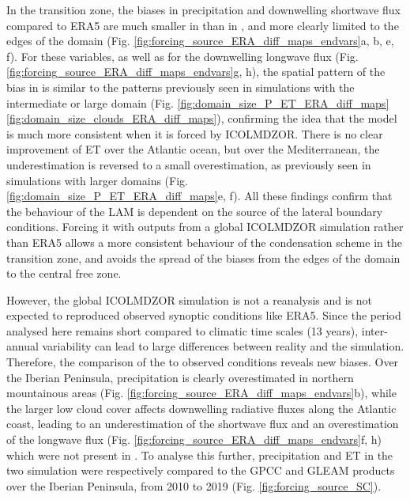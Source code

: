 In the transition zone, the biases in precipitation and downwelling shortwave flux compared to ERA5 are much smaller in \forcingICO than in \forcingERA, and more clearly limited to the edges of the domain (Fig. \ref{fig:forcing_source_ERA_diff_maps_endvars}a, b, e, f). For these variables, as well as for the downwelling longwave flux (Fig. \ref{fig:forcing_source_ERA_diff_maps_endvars}g, h), the spatial pattern of the bias in \forcingICO is similar to the patterns previously seen in simulations with the intermediate or large domain (Fig. \ref{fig:domain_size_P_ET_ERA_diff_maps} \ref{fig:domain_size_clouds_ERA_diff_maps}), confirming the idea that the model is much more consistent when it is forced by ICOLMDZOR. There is no clear improvement of ET over the Atlantic ocean, but over the Mediterranean, the underestimation is reversed to a small overestimation, as previously seen in simulations with larger domains (Fig. \ref{fig:domain_size_P_ET_ERA_diff_maps}e, f).
All these findings confirm that the behaviour of the LAM is dependent on the source of the lateral boundary conditions. Forcing it with outputs from a global ICOLMDZOR simulation rather than ERA5 allows a more consistent behaviour of the condensation scheme in the transition zone, and avoids the spread of the biases from the edges of the domain to the central free zone.

\hfill

However, the global ICOLMDZOR simulation is not a reanalysis and is not expected to reproduced observed synoptic conditions like ERA5. Since the period analysed here remains short compared to climatic time scales (13 years), inter-annual variability can lead to large differences between reality and the simulation. Therefore, the comparison of the \forcingICO to observed conditions reveals new biases. Over the Iberian Peninsula, precipitation is clearly overestimated in northern mountainous areas (Fig. \ref{fig:forcing_source_ERA_diff_maps_endvars}b), while the larger low cloud cover affects downwelling radiative fluxes along the Atlantic coast, leading to an underestimation of the shortwave flux and an overestimation of the longwave flux (Fig. \ref{fig:forcing_source_ERA_diff_maps_endvars}f, h) which were not present in \forcingERA.
To analyse this further, precipitation and ET in the two simulation were respectively compared to the GPCC and GLEAM products over the Iberian Peninsula, from 2010 to 2019 (Fig. \ref{fig:forcing_source_SC}).

